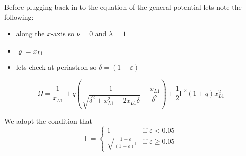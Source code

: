 \documentclass[12pt]{article}
\newcommand{\syncpar}{\mathsf{F}}
\begin{document}
Before plugging back in to the equation of the general potential lets note the following:
\begin{itemize}
    \item along the $x$-axis so $\nu = 0$ and $\lambda = 1$
    \item $\varrho = x_{L1}$
    \item lets check at periastron so $\delta = (1-\varepsilon)$
\end{itemize}
\begin{equation}
    \Omega = \frac{1}{x_{L1}} + q \left( \frac{1}{\sqrt{ \delta^2
                                                        + x_{L1}^2
                                                        - 2x_{L1}\delta
                                                        }
                                                  }
                                        - \frac{x_{L1}}{\delta^2}
                                   \right)
                                   + \frac{1}{2}\syncpar^2(1+q)x_{L1}^2
\end{equation}


We adopt the condition that
\begin{equation}
\syncpar = 
    \begin{cases}
        1 & \text{if } \varepsilon < 0.05 \\
        \sqrt{\frac{1+\varepsilon}{(1-\varepsilon)^3}} & \text{if } \varepsilon \geq 0.05
   \end{cases}
\end{equation}
\end{document}
